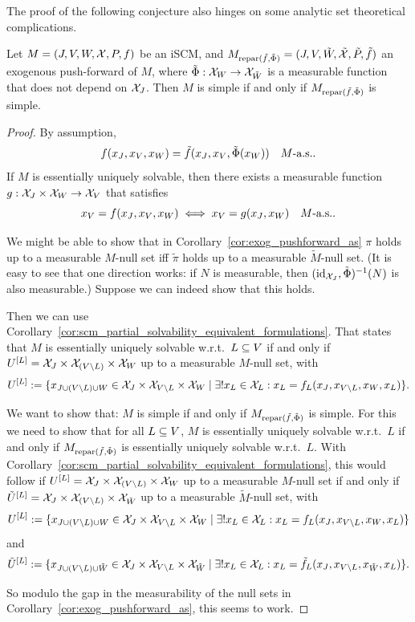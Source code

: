 The proof of the following conjecture also hinges on some analytic set theoretical complications.
\begin{Con}
  Let $M = \left ( J, V, W, \mathcal{X}, P, f \right )$ be an iSCM, and $M_{\mathrm{repar}({\tilde{f}},{\tilde{\Phi}})} = ( J, V, \tilde{W}, \tilde{\mathcal{X}}, \tilde{P}, \tilde{f} )$ an exogenous push-forward of $M$, where $\tilde\Phi : \mathcal{X}_W \to \mathcal{X}_{\tilde{W}}$ is a measurable function that does not depend on $\mathcal{X}_J$.
  Then $M$ is simple if and only if $M_{\mathrm{repar}({\tilde{f}},{\tilde{\Phi}})}$ is simple.
\end{Con}
\begin{proof}
  By assumption,
  $$f(x_J,x_V,x_W) = \tilde{f}(x_J,x_V,\tilde{\Phi}(x_W)) \quad M\text{-a.s.}.$$
  If $M$ is essentially uniquely solvable, then there exists a measurable function $g : \mathcal{X}_J \times \mathcal{X}_W \to \mathcal{X}_V$ that satisfies
    $$x_V = f(x_J,x_V,x_W) \iff x_V = g(x_J,x_W)\quad M\text{-a.s.}.$$

  We might be able to show that in Corollary~\ref{cor:exog_pushforward_as} $\pi$ holds up to a measurable $M$-null set iff $\tilde\pi$ holds up to a measurable $\tilde{M}$-null set.
  (It is easy to see that one direction works: if $N$ is measurable, then $(\mathrm{id}_{\mathcal{X}_J},\tilde\Phi)^{-1}(N)$ is also measurable.)
  Suppose we can indeed show that this holds.

  Then we can use Corollary~\ref{cor:scm_partial_solvability_equivalent_formulations}. 
  That states that $M$ is essentially uniquely solvable w.r.t.\ $L \subseteq V$ if and only if 
  $U^{[L]} = \mathcal{X}_J \times \mathcal{X}_{(V\setminus L)} \times \mathcal{X}_W$ up to a measurable $M$-null set, with
  $$U^{[L]} := \{x_{J \cup (V\setminus L) \cup W} \in \mathcal{X}_J \times \mathcal{X}_{V\setminus L} \times \mathcal{X}_W \mid \exists! x_L \in \mathcal{X}_L : x_L = f_L(x_J,x_{V\setminus L},x_W,x_L)\}.$$
  
  We want to show that: $M$ is simple if and only if $M_{\mathrm{repar}({\tilde{f}},{\tilde{\Phi}})}$ is simple.
  For this we need to show that for all $L \subseteq V$,
  $M$ is essentially uniquely solvable w.r.t.\ $L$ if and only if $M_{\mathrm{repar}({\tilde{f}},{\tilde{\Phi}})}$ is essentially uniquely solvable w.r.t.\ $L$.
  With Corollary~\ref{cor:scm_partial_solvability_equivalent_formulations}, this would follow if
  $U^{[L]} = \mathcal{X}_J \times \mathcal{X}_{(V\setminus L)} \times \mathcal{X}_W$ up to a measurable $M$-null set if and only if
  $\tilde{U}^{[L]} = \mathcal{X}_J \times \mathcal{X}_{(V\setminus L)} \times \mathcal{X}_{\tilde{W}}$ up to a measurable $\tilde{M}$-null set,
  with
  $$U^{[L]} := \{x_{J \cup (V\setminus L) \cup W} \in \mathcal{X}_J \times \mathcal{X}_{V\setminus L} \times \mathcal{X}_W \mid \exists! x_L \in \mathcal{X}_L : x_L = f_L(x_J,x_{V\setminus L},x_W,x_L)\}$$
  and
  $$\tilde{U}^{[L]} := \{x_{J \cup (V\setminus L) \cup \tilde{W}} \in \mathcal{X}_J \times \mathcal{X}_{V\setminus L} \times \mathcal{X}_{\tilde{W}} \mid \exists! x_L \in \mathcal{X}_L : x_L = \tilde{f}_L(x_J,x_{V\setminus L},x_{\tilde{W}},x_L)\}.$$

  So modulo the gap in the measurability of the null sets in Corollary~\ref{cor:exog_pushforward_as}, this seems to work.
\end{proof}


